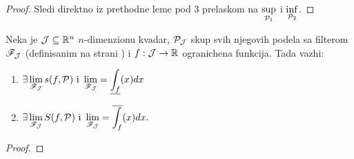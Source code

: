 \documentclass[../main.tex]{subfiles}
\begin{document}
    \begin{proof}
    	Sledi direktno iz prethodne leme pod 3 prelaskom na $\displaystyle{\sup_{\mathcal{P}_1}}$ i $\displaystyle{\inf_{\mathcal{P}_2}}$.
    \end{proof}

    \begin{te}
	Neka je $\mathcal{J}\subseteq \mathbb{R}^n$ $n$-dimenzionu kvadar, $\mathcal{P}_{\mathcal{J}}$ skup svih njegovih podela sa filterom $\mathscr{F}_{\mathcal{J}}$ (definisanim na strani \pageref{filterpodela}) i 
	$f: \mathcal{J} \to \mathbb{R}$ ogranichena funkcija. Tada vazhi:
	\begin{enumerate}
	    \item 
	    	$\displaystyle{\exists \lim_{\mathscr{F}_{\mathcal{J}}} s(f,\mathcal{P}) \text{ i } \lim_{\mathscr{F}_{\mathcal{J}}} = \underline{\int_{f}}(x)dx}$
	    \item 
	    	$\displaystyle{\exists \lim_{\mathscr{F}_{\mathcal{J}}} S(f,\mathcal{P}) \text{ i } \lim_{\mathscr{F}_{\mathcal{J}}} = \overline{\int_{f}}(x)dx}.$
	\end{enumerate}
    \end{te}

    \begin{proof}
    \end{proof}
\end{document}
